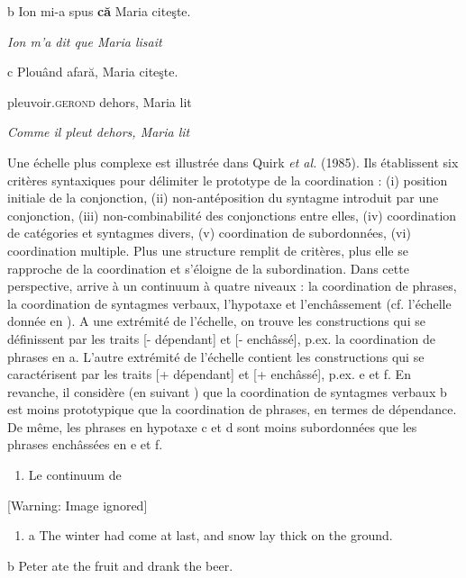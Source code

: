   b  Ion mi-a spus \textbf{că} Maria citeşte.

{\itshape
Ion m'a dit que Maria lisait}

  c  Plouând  afară,  Maria  citeşte.

    pleuvoir.\textsc{gerond}  dehors,  Maria  lit

    \textit{Comme il pleut dehors, Maria lit}

Une échelle plus complexe est illustrée dans Quirk \textit{et al.} (1985). Ils établissent six critères syntaxiques pour délimiter le prototype de la coordination : (i) position initiale de la conjonction, (ii) non-antéposition du syntagme introduit par une conjonction, (iii) non-combinabilité des conjonctions entre elles, (iv) coordination de catégories et syntagmes divers, (v) coordination de subordonnées, (vi) coordination multiple. Plus une structure remplit de critères, plus elle se rapproche de la coordination et s'éloigne de la subordination. Dans cette perspective, \citet{Cosme2008} arrive à un continuum à quatre niveaux : la coordination de phrases, la coordination de syntagmes verbaux, l'hypotaxe et l'enchâssement (cf. l'échelle donnée en ). A une extrémité de l'échelle, on trouve les constructions qui se définissent par les traits [- dépendant] et [- enchâssé], p.ex. la coordination de phrases en a. L'autre extrémité de l'échelle contient les constructions qui se caractérisent par les traits [+ dépendant] et [+ enchâssé], p.ex. e et f. En revanche, il considère (en suivant \citet{Cristofaro2003}) que la coordination de syntagmes verbaux b est moins prototypique que la coordination de phrases, en termes de dépendance. De même, les phrases en hypotaxe c et d sont moins subordonnées que les phrases enchâssées en e et f.  


\begin{enumerate}
\item \label{bkm:Ref300155561}Le continuum de \citet{Cosme2008}


\end{enumerate}
{   [Warning: Image ignored] %
} 


\begin{enumerate}
\item \label{bkm:Ref300155698}a  The winter had come at last, and snow lay thick on the ground.  


\end{enumerate}
  b  Peter ate the fruit and drank the beer.

